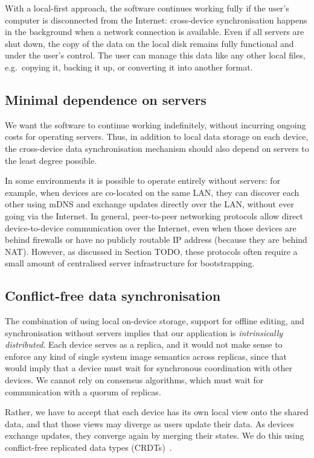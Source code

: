 \documentclass[sigplan,10pt]{acmart}
\begin{document}
With a local-first approach, the software continues working fully if the user's computer is disconnected from the Internet: cross-device synchronisation happens in the background when a network connection is available.
Even if all servers are shut down, the copy of the data on the local disk remains fully functional and under the user's control.
The user can manage this data like any other local files, e.g.\ copying it, backing it up, or converting it into another format.

\subsection{Minimal dependence on servers}

We want the software to continue working indefinitely, without incurring ongoing costs for operating servers.
Thus, in addition to local data storage on each device, the cross-device data synchronisation mechanism should also depend on servers to the least degree possible.

In some environments it is possible to operate entirely without servers: for example, when devices are co-located on the same LAN, they can discover each other using mDNS and exchange updates directly over the LAN, without ever going via the Internet.
In general, peer-to-peer networking protocols allow direct device-to-device communication over the Internet, even when those devices are behind firewalls or have no publicly routable IP address (because they are behind NAT).
However, as discussed in Section TODO, these protocols often require a small amount of centralised server infrastructure for bootstrapping.

\subsection{Conflict-free data synchronisation}

The combination of using local on-device storage, support for offline editing, and synchronisation without servers implies that our application is \emph{intrinsically distributed}.
Each device serves as a replica, and it would not make sense to enforce any kind of single system image semantics across replicas, since that would imply that a device must wait for synchronous coordination with other devices.
We cannot rely on consensus algorithms, which must wait for communication with a quorum of replicas.

Rather, we have to accept that each device has its own local view onto the shared data, and that those views may diverge as users update their data.
As devices exchange updates, they converge again by merging their states.
We do this using conflict-free replicated data types (CRDTs)~\cite{Shapiro:2011un}.
\end{document}
